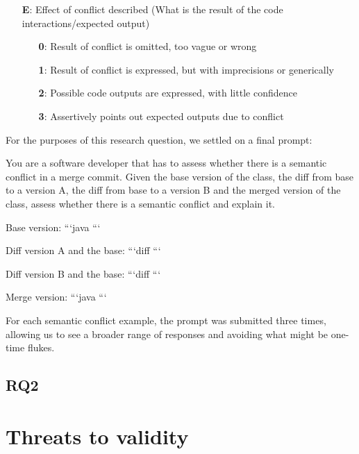 \begin{itemize}
  \item[\textbf{E}:] Effect of conflict described (What is the result of the code interactions/expected output)
  \begin{itemize}
    \item[\textbf{0}:] Result of conflict is omitted, too vague or wrong
    \item[\textbf{1}:] Result of conflict is expressed, but with imprecisions or generically
    \item[\textbf{2}:] Possible code outputs are expressed, with little confidence
    \item[\textbf{3}:] Assertively points out expected outputs due to conflict
  \end{itemize}
\end{itemize}

For the purposes of this research question, we settled on a final prompt:

\begin{prompt}
You are a software developer that has to assess whether there is a semantic conflict in a merge commit.  Given the base version of the class, the diff from base to a version A, the diff from base to a version B and the merged version of the class, assess whether there is a semantic conflict and explain it.

Base version:
```java
```

Diff version A and the base:
```diff
```

Diff version B and the base:
```diff
```

Merge version:
```java
```
\end{prompt}

For each semantic conflict example, the prompt was submitted three times,
allowing us to see a broader range of responses and avoiding what might be
one-time flukes.

\subsection{RQ2}



\section{Threats to validity}


